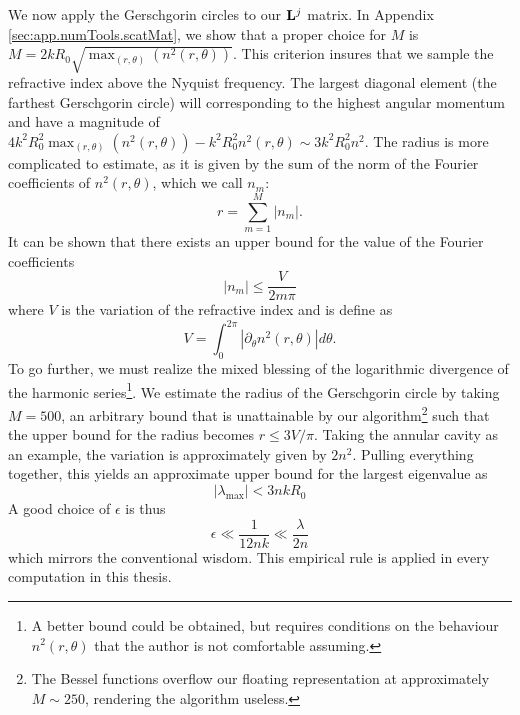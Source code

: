 We now apply the Gerschgorin circles to our $\mathbf{L}^j$ matrix. 
In Appendix \ref{sec:app.numTools.scatMat}, we show that a proper choice for $M$
is $M=2kR_0\sqrt{\mathop{\max}_{(r,\theta)}\left(n^2(r,\theta)\right)}$. This criterion
insures that we sample the refractive index above the Nyquist frequency. The largest
diagonal element (the farthest Gerschgorin circle) will corresponding
to the highest angular momentum and have a magnitude of 
$4k^2R_0^2\mathop{\max}_{(r,\theta)}\left(n^2(r,\theta)\right)-k^2R_0^2n^2(r,\theta)\sim3k^2R_0^2n^2$.
The radius is more complicated to estimate, as it is given by the sum of the norm
of the Fourier coefficients of $n^2(r,\theta)$, which we call $n_m$:
  \begin{equation}
   r = \sum_{m=1}^M |n_m|.
  \end{equation}
It can be shown that there exists an upper bound for the value of the
Fourier coefficients \cite{JAC1920}
  \begin{equation}
   |n_m| \leq \frac{V}{2m\pi}
  \end{equation}
where $V$ is the variation of the refractive index and is define as
  \begin{equation}
   V = \int_0^{2\pi}\left|\partial_\theta n^2(r,\theta)\right|d\theta.
  \end{equation}
To go further, we must realize the mixed blessing of the logarithmic
divergence of the harmonic series\footnote{A better bound could be obtained, but requires conditions
on the behaviour $n^2(r,\theta)$ that the author is not comfortable assuming.}. We estimate the radius
of the Gerschgorin circle by taking $M=500$, an arbitrary bound
that is unattainable by our algorithm\footnote{The Bessel functions overflow our floating representation at approximately $M\sim250$,
rendering the algorithm useless.}
such that the upper bound for the radius becomes $r\leq 3V/\pi$. Taking the annular
cavity as an example, the variation is approximately given by 
$2n^2$. Pulling everything together, this yields an approximate upper
bound for the largest eigenvalue as
  \begin{equation}
   |\lambda_\text{max}| < 3nkR_0
  \end{equation}
A good choice of $\epsilon$ is thus
  \begin{equation}
   \epsilon \ll \frac{1}{12nk} \ll \frac{\lambda}{2n}
  \end{equation}
which mirrors the conventional wisdom. This empirical rule
is applied in every computation in this thesis.

